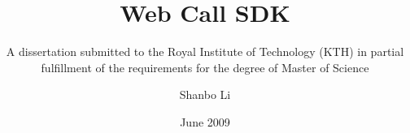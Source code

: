 \title{Web Call SDK}
\subtitle{A dissertation submitted to
          the Royal Institute of Technology (KTH)
          in partial fulfillment of the requirements for
          the degree of Master of Science}
\author{Shanbo Li}
\date{June 2009}
